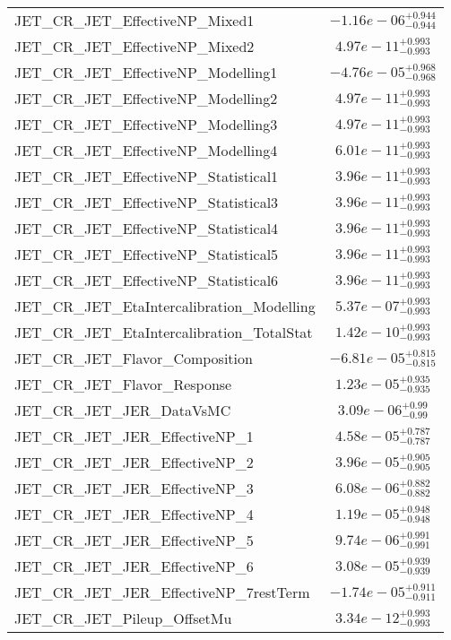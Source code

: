 \begin{tabular}{|l|c|}
JET\_CR\_JET\_EffectiveNP\_Mixed1 & $-1.16e-06^{+0.944}_{-0.944}$ \\
JET\_CR\_JET\_EffectiveNP\_Mixed2 & $4.97e-11^{+0.993}_{-0.993}$ \\
JET\_CR\_JET\_EffectiveNP\_Modelling1 & $-4.76e-05^{+0.968}_{-0.968}$ \\
JET\_CR\_JET\_EffectiveNP\_Modelling2 & $4.97e-11^{+0.993}_{-0.993}$ \\
JET\_CR\_JET\_EffectiveNP\_Modelling3 & $4.97e-11^{+0.993}_{-0.993}$ \\
JET\_CR\_JET\_EffectiveNP\_Modelling4 & $6.01e-11^{+0.993}_{-0.993}$ \\
JET\_CR\_JET\_EffectiveNP\_Statistical1 & $3.96e-11^{+0.993}_{-0.993}$ \\
JET\_CR\_JET\_EffectiveNP\_Statistical3 & $3.96e-11^{+0.993}_{-0.993}$ \\
JET\_CR\_JET\_EffectiveNP\_Statistical4 & $3.96e-11^{+0.993}_{-0.993}$ \\
JET\_CR\_JET\_EffectiveNP\_Statistical5 & $3.96e-11^{+0.993}_{-0.993}$ \\
JET\_CR\_JET\_EffectiveNP\_Statistical6 & $3.96e-11^{+0.993}_{-0.993}$ \\
JET\_CR\_JET\_EtaIntercalibration\_Modelling & $5.37e-07^{+0.993}_{-0.993}$ \\
JET\_CR\_JET\_EtaIntercalibration\_TotalStat & $1.42e-10^{+0.993}_{-0.993}$ \\
JET\_CR\_JET\_Flavor\_Composition & $-6.81e-05^{+0.815}_{-0.815}$ \\
JET\_CR\_JET\_Flavor\_Response & $1.23e-05^{+0.935}_{-0.935}$ \\
JET\_CR\_JET\_JER\_DataVsMC & $3.09e-06^{+0.99}_{-0.99}$ \\
JET\_CR\_JET\_JER\_EffectiveNP\_1 & $4.58e-05^{+0.787}_{-0.787}$ \\
JET\_CR\_JET\_JER\_EffectiveNP\_2 & $3.96e-05^{+0.905}_{-0.905}$ \\
JET\_CR\_JET\_JER\_EffectiveNP\_3 & $6.08e-06^{+0.882}_{-0.882}$ \\
JET\_CR\_JET\_JER\_EffectiveNP\_4 & $1.19e-05^{+0.948}_{-0.948}$ \\
JET\_CR\_JET\_JER\_EffectiveNP\_5 & $9.74e-06^{+0.991}_{-0.991}$ \\
JET\_CR\_JET\_JER\_EffectiveNP\_6 & $3.08e-05^{+0.939}_{-0.939}$ \\
JET\_CR\_JET\_JER\_EffectiveNP\_7restTerm & $-1.74e-05^{+0.911}_{-0.911}$ \\
JET\_CR\_JET\_Pileup\_OffsetMu & $3.34e-12^{+0.993}_{-0.993}$ \\

\end{tabular}
